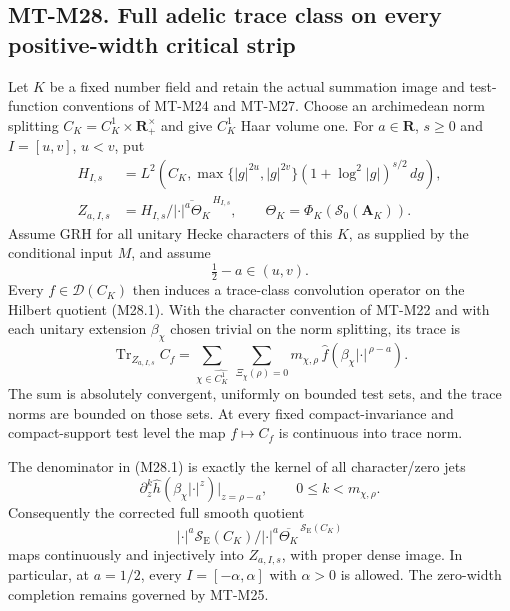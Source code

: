 \subsection*{MT-M28. Full adelic trace class on every positive-width critical strip}
Let \(K\) be a fixed number field and retain the actual summation
image and test-function conventions of MT-M24 and MT-M27. Choose
an archimedean norm splitting \(C_K=C_K^1\times\mathbf R_+^\times\)
and give \(C_K^1\) Haar volume one. For \(a\in\mathbf R\), \(s\ge0\)
and \(I=[u,v]\), \(u<v\), put
\[
 \begin{split}
 H_{I,s}&=L^2\!\left(C_K,
    \max\{|g|^{2u},|g|^{2v}\}
         (1+\log^2|g|)^{s/2}\,dg\right),\\
 Z_{a,I,s}&=H_{I,s}/
       \overline{|\cdot|^a\Theta_K}^{\,H_{I,s}},
 \qquad \Theta_K=\Phi_K(\mathcal S_0(\mathbf A_K)).
 \end{split}                                                    \tag{M28.1}
\]
Assume GRH for all unitary Hecke characters of this \(K\), as
supplied by the conditional input \(M\), and assume
\[
                         \tfrac12-a\in(u,v).                  \tag{M28.2}
\]
Every \(f\in\mathcal D(C_K)\) then induces a trace-class
convolution operator on the Hilbert quotient (M28.1). With the
character convention of MT-M22 and with each unitary extension
\(\beta_\chi\) chosen trivial on the norm splitting, its trace is
\[
 \operatorname{Tr}_{Z_{a,I,s}}C_f
   =\sum_{\chi\in\widehat{C_K^1}}\ \sum_{\Xi_\chi(\rho)=0}
          m_{\chi,\rho}\,
          \widehat f(\beta_\chi|\cdot|^{\,\rho-a}).
                                                               \tag{M28.3}
\]
The sum is absolutely convergent, uniformly on bounded test
sets, and the trace norms are bounded on those sets. At every
fixed compact-invariance and compact-support test level the
map \(f\mapsto C_f\) is continuous into trace norm.

The denominator in (M28.1) is exactly the kernel of all
character/zero jets
\[
 \partial_z^k\widehat h(\beta_\chi|\cdot|^z)
                  \big|_{z=\rho-a},\qquad 0\le k<m_{\chi,\rho}.
                                                               \tag{M28.4}
\]
Consequently the corrected full smooth quotient
\[
 |\cdot|^a\mathcal S_{\mathrm E}(C_K)\big/
           |\cdot|^a\overline{\Theta_K}^{\,\mathcal S_{\mathrm E}(C_K)}
                                                               \tag{M28.5}
\]
maps continuously and injectively into \(Z_{a,I,s}\), with
proper dense image. In particular, at \(a=1/2\), every
\(I=[-\alpha,\alpha]\) with \(\alpha>0\) is allowed.
The zero-width completion remains governed by MT-M25.

